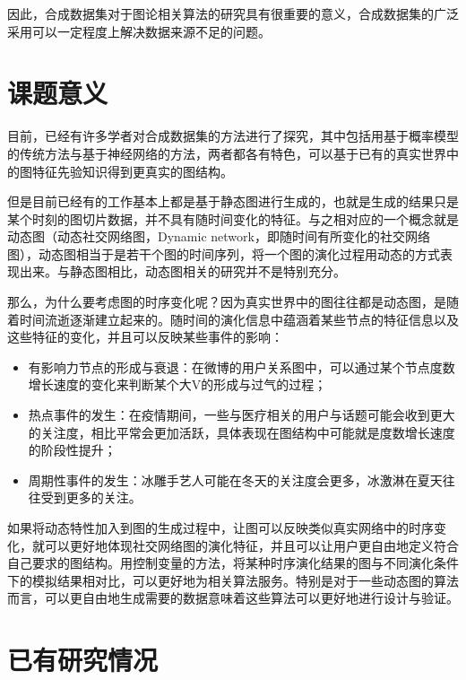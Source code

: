 \vspace{0.2cm}

因此，合成数据集对于图论相关算法的研究具有很重要的意义，合成数据集的广泛采用可以一定程度上解决数据来源不足的问题。

\section{课题意义}

目前，已经有许多学者对合成数据集的方法进行了探究，其中包括用基于概率模型的传统方法与基于神经网络的方法，两者都各有特色，可以基于已有的真实世界中的图特征先验知识得到更真实的图结构。

但是目前已经有的工作基本上都是基于静态图进行生成的，也就是生成的结果只是某个时刻的图切片数据，并不具有随时间变化的特征。与之相对应的一个概念就是动态图（动态社交网络图，Dynamic network，即随时间有所变化的社交网络图\cite{sarkar2006dynamic}），动态图相当于是若干个图的时间序列，将一个图的演化过程用动态的方式表现出来。与静态图相比，动态图相关的研究并不是特别充分。

那么，为什么要考虑图的时序变化呢？因为真实世界中的图往往都是动态图，是随着时间流逝逐渐建立起来的。随时间的演化信息中蕴涵着某些节点的特征信息以及这些特征的变化，并且可以反映某些事件的影响：

\begin{itemize}
  \item 有影响力节点的形成与衰退\cite{braha2006centrality}：在微博的用户关系图中，可以通过某个节点度数增长速度的变化来判断某个大V的形成与过气的过程；
  \item 热点事件的发生：在疫情期间，一些与医疗相关的用户与话题可能会收到更大的关注度，相比平常会更加活跃，具体表现在图结构中可能就是度数增长速度的阶段性提升；
  \item 周期性事件的发生：冰雕手艺人可能在冬天的关注度会更多，冰激淋在夏天往往受到更多的关注。
\end{itemize}

\vspace{0.2cm}

如果将动态特性加入到图的生成过程中，让图可以反映类似真实网络中的时序变化，就可以更好地体现社交网络图的演化特征，并且可以让用户更自由地定义符合自己要求的图结构。用控制变量的方法，将某种时序演化结果的图与不同演化条件下的模拟结果相对比，可以更好地为相关算法服务。特别是对于一些动态图的算法而言，可以更自由地生成需要的数据意味着这些算法可以更好地进行设计与验证。

\section{已有研究情况}

